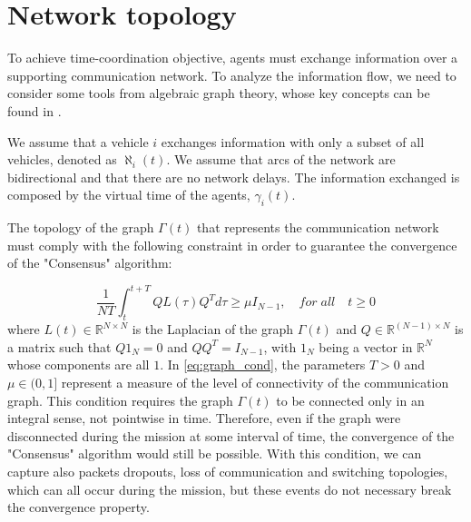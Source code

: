\section{Network topology\label{sec:network_topology}}

To achieve time-coordination objective, agents must exchange information
over a supporting communication network.
To analyze the information flow, we need to consider some tools from algebraic graph
theory, whose key concepts can be found in \cite{graphBook}.

We assume that a vehicle $i$ exchanges information with only a subset of all
vehicles, denoted as $\aleph_i(t)$.
We assume that arcs of the network are bidirectional and that there are no
network delays.
The information exchanged is composed by the virtual time of the agents,
$\gamma_i(t)$.

The topology of the graph $\Gamma(t)$ that represents the communication network
must comply with the following constraint in order to guarantee the convergence
of the "Consensus" algorithm:

\begin{equation}  \label{eq:graph_cond}
  \frac{1}{NT} \int_t^{t+T} Q L (\tau) Q^T d \tau \ge \mu I_{N-1}, \quad for \; all \quad t \ge 0
\end{equation}
where $L(t) \in \mathbb{R}^{N \times N}$ is the Laplacian of the graph $\Gamma(t)$
and $Q \in \mathbb{R}^{(N-1) \times N}$ is a matrix such that $Q 1_N = 0$ and
$QQ^T = I_{N-1}$, with $1_N$ being a vector in $\mathbb{R}^N$ whose components
are all $1$.
In \eqref{eq:graph_cond}, the parameters $T > 0$ and $\mu \in (0,1]$ represent
a measure of the level of connectivity of the communication graph.
This condition requires the graph $\Gamma(t)$ to be connected only in an integral
sense, not pointwise in time. Therefore, even if the graph were disconnected during
the mission at some interval of time, the convergence of the "Consensus" algorithm
would still be possible.
With this condition, we can capture also packets dropouts, loss of communication and
switching topologies, which can all occur during the mission, but these events do not necessary
break the convergence property.

